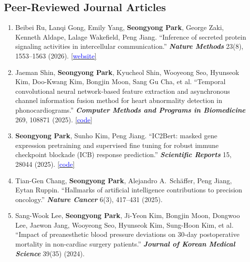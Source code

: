 \begin{scriptsize}

\subsection*{Peer-Reviewed Journal Articles}
\begin{enumerate}

    \item Beibei Ru, Lanqi Gong, Emily Yang, \textbf{Seongyong Park}, George Zaki, Kenneth Aldape, Lalage Wakefield, Peng Jiang. ``Inference of secreted protein signaling activities in intercellular communication.'' \textit{\textbf{Nature Methods}} 23(8), 1553--1563 (2026). \href{https://secact.ccr.cancer.gov}{[\textcolor{blue}{website}]}

    \item Jaeman Shin, \textbf{Seongyong Park}, Kyucheol Shin, Wooyeong Seo, Hyunseok Kim, Doo-Kwang Kim, Bongjin Moon, Sang Gu Cha, et al. ``Temporal convolutional neural network-based feature extraction and asynchronous channel information fusion method for heart abnormality detection in phonocardiograms.'' \textit{\textbf{Computer Methods and Programs in Biomedicine}} 269, 108871 (2025). \href{https://github.com/baporlab/pcg_pathological_murmur_detection}{[\textcolor{blue}{code}]}

    \item \textbf{Seongyong Park}, Sunho Kim, Peng Jiang. ``IC2Bert: masked gene expression pretraining and supervised fine tuning for robust immune checkpoint blockade (ICB) response prediction.'' \textit{\textbf{Scientific Reports}} 15, 28044 (2025). \href{https://github.com/data2intelligence/ic2bert}{[\textcolor{blue}{code}]}

    \item Tian-Gen Chang, \textbf{Seongyong Park}, Alejandro A.\ Sch\"affer, Peng Jiang, Eytan Ruppin. ``Hallmarks of artificial intelligence contributions to precision oncology.'' \textit{\textbf{Nature Cancer}} 6(3), 417--431 (2025).

    \item Sang-Wook Lee, \textbf{Seongyong Park}, Ji-Yeon Kim, Bongjin Moon, Dongwoo Lee, Jaewon Jang, Wooyeong Seo, Hyunseok Kim, Sung-Hoon Kim, et al. ``Impact of preanesthetic blood pressure deviations on 30-day postoperative mortality in non-cardiac surgery patients.'' \textit{\textbf{Journal of Korean Medical Science}} 39(35) (2024).


\end{enumerate}
\end{scriptsize}
